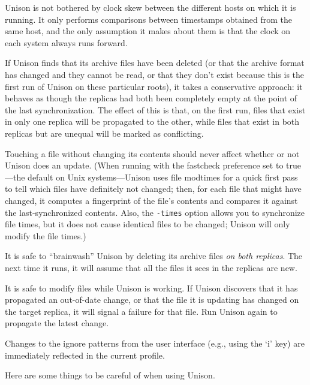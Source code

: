 \documentclass{article}
\begin{document}
Unison is not bothered by clock skew between the different hosts on
which it is running.  It only performs comparisons between timestamps
obtained from the same host, and the only assumption it makes about
them is that the clock on each system always runs forward.

If Unison finds that its archive files have been deleted (or that the
archive format has changed and they cannot be read, or that they don't
exist because this is the first run of Unison on these particular
roots), it takes a conservative approach: it behaves as though the
replicas had both been completely empty at the point of the last
synchronization.  The effect of this is that, on the first run, files
that exist in only one replica will be propagated to the other, while
files that exist in both replicas but are unequal will be marked as
conflicting. 

Touching a file without changing its contents should never affect whether or
not Unison does an update. (When running with the fastcheck preference set
to true---the default on Unix systems---Unison uses file modtimes for a
quick first pass to tell which files have definitely not changed; then, for
each file that might have changed, it computes a fingerprint of the file's
contents and compares it against the last-synchronized contents. Also, the
\verb|-times| option allows you to synchronize file times, but it does not
cause identical files to be changed; Unison will only modify the file
times.)

It is safe to ``brainwash'' Unison by deleting its archive files
{\em on both replicas}.  The next time it runs, it will assume that
all the files it sees in the replicas are new.  

It is safe to modify files while Unison is working.  If Unison
discovers that it has propagated an out-of-date change, or that the
file it is updating has changed on the target replica, it will signal
a failure for that file.  Run Unison again to propagate the latest
change.

Changes to the ignore patterns from the user interface (e.g., using
the `i' key) are immediately reflected in the current profile.



Here are some things to be careful of when using Unison.  
\end{document}
